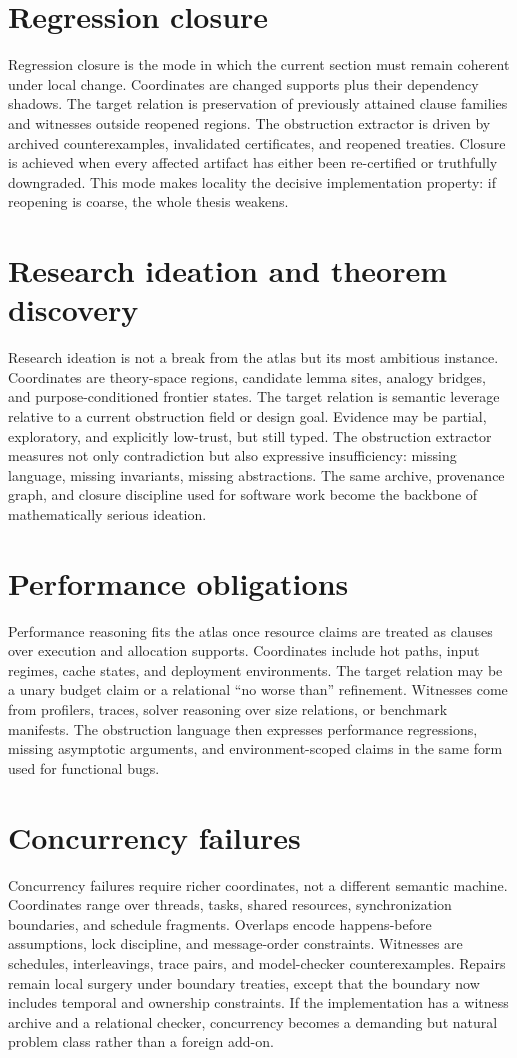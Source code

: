 \documentclass[11pt]{report}
\begin{document}
\section{Regression closure}
Regression closure is the mode in which the current section must remain coherent under local change. Coordinates are changed supports plus their dependency shadows. The target relation is preservation of previously attained clause families and witnesses outside reopened regions. The obstruction extractor is driven by archived counterexamples, invalidated certificates, and reopened treaties. Closure is achieved when every affected artifact has either been re-certified or truthfully downgraded. This mode makes locality the decisive implementation property: if reopening is coarse, the whole thesis weakens.
\section{Research ideation and theorem discovery}
Research ideation is not a break from the atlas but its most ambitious instance. Coordinates are theory-space regions, candidate lemma sites, analogy bridges, and purpose-conditioned frontier states. The target relation is semantic leverage relative to a current obstruction field or design goal. Evidence may be partial, exploratory, and explicitly low-trust, but still typed. The obstruction extractor measures not only contradiction but also expressive insufficiency: missing language, missing invariants, missing abstractions. The same archive, provenance graph, and closure discipline used for software work become the backbone of mathematically serious ideation.
\section{Performance obligations}
Performance reasoning fits the atlas once resource claims are treated as clauses over execution and allocation supports. Coordinates include hot paths, input regimes, cache states, and deployment environments. The target relation may be a unary budget claim or a relational ``no worse than'' refinement. Witnesses come from profilers, traces, solver reasoning over size relations, or benchmark manifests. The obstruction language then expresses performance regressions, missing asymptotic arguments, and environment-scoped claims in the same form used for functional bugs.
\section{Concurrency failures}
Concurrency failures require richer coordinates, not a different semantic machine. Coordinates range over threads, tasks, shared resources, synchronization boundaries, and schedule fragments. Overlaps encode happens-before assumptions, lock discipline, and message-order constraints. Witnesses are schedules, interleavings, trace pairs, and model-checker counterexamples. Repairs remain local surgery under boundary treaties, except that the boundary now includes temporal and ownership constraints. If the implementation has a witness archive and a relational checker, concurrency becomes a demanding but natural problem class rather than a foreign add-on.
\end{document}
